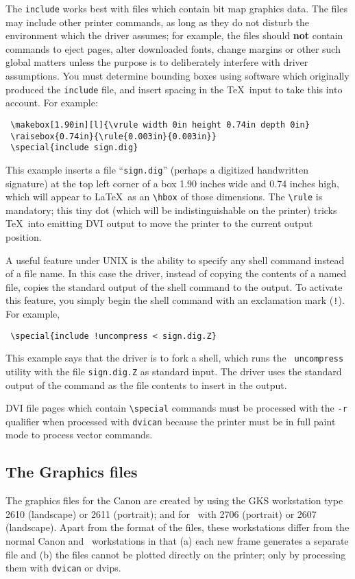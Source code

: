 The {\tt include} works best with files which contain bit map graphics data.
The files may include other printer commands, as long as they do not disturb
the environment which the driver assumes; for example, the files should 
{\bf not}
contain commands to eject pages, alter downloaded fonts, change margins or
other such global matters unless the purpose is to deliberately interfere
with driver assumptions. You must determine bounding boxes using software which
originally produced the {\tt include} file, and insert spacing in the \TeX\
input to take this into account. For example:
\begin{verbatim}
 \makebox[1.90in][l]{\vrule width 0in height 0.74in depth 0in}
 \raisebox{0.74in}{\rule{0.003in}{0.003in}}
 \special{include sign.dig}
\end{verbatim}
This example inserts a file ``{\tt sign.dig}'' (perhaps a digitized handwritten
signature) at the top left corner of a box 1.90 inches wide and 0.74 inches
high, which will appear to \LaTeX\ as an \verb+\hbox+ of those dimensions. The
\verb+\rule+ is mandatory; this tiny dot (which will be indistinguishable on
the printer) tricks \TeX\ into emitting DVI output to move the printer to the
current output position.

A useful feature under UNIX is the ability to specify any shell command instead
of a file name. In this case the driver, instead of copying the contents of a
named file, copies the standard output of the shell command to the output. To
activate this feature, you simply begin the shell command with an exclamation
mark ({\tt !}). For example,
\begin{verbatim}
 \special{include !uncompress < sign.dig.Z}
\end{verbatim}
This example says that the driver is to fork a shell, which runs the {\tt
uncompress} utility with the file {\tt sign.dig.Z} as standard input. The
driver uses the standard output of the command as the file contents to insert in
the output.




DVI file pages which contain \verb+\special+ commands must be processed with
the {\tt -r} qualifier when processed with \verb+dvican+ because the printer must be
in  full paint mode to process vector commands.

\subsection{The Graphics files}

The graphics files for the Canon are created by using the GKS workstation  type
2610 (landscape) or 2611 (portrait); and for \PS\ with 2706 (portrait) or 
2607 (landscape). Apart from the format of the files, these workstations differ
from the normal Canon and \PS\ workstations in that  (a) each new frame
generates a separate file and (b) the files cannot be plotted directly on the
printer; only by processing them with \verb+dvican+ or dvips. 

